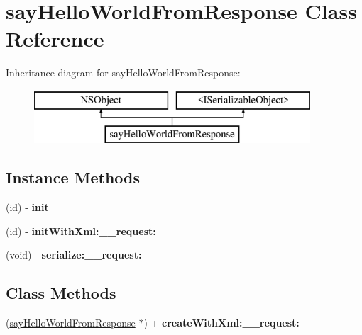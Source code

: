 \hypertarget{interfacesay_hello_world_from_response}{}\section{say\+Hello\+World\+From\+Response Class Reference}
\label{interfacesay_hello_world_from_response}
Inheritance diagram for say\+Hello\+World\+From\+Response\+:\begin{figure}[H]
\begin{center}
\leavevmode
\includegraphics[height=2.000000cm]{interfacesay_hello_world_from_response}
\end{center}
\end{figure}
\subsection*{Instance Methods}
\begin{DoxyCompactItemize}
\item 
\hypertarget{interfacesay_hello_world_from_response_aa3250bb384dc234066e4f31fa0947bf1}{}(id) -\/ {\bfseries init}\label{interfacesay_hello_world_from_response_aa3250bb384dc234066e4f31fa0947bf1}

\item 
\hypertarget{interfacesay_hello_world_from_response_a0945b9d35fece5dc2111ef72299a0932}{}(id) -\/ {\bfseries init\+With\+Xml\+:\+\_\+\+\_\+request\+:}\label{interfacesay_hello_world_from_response_a0945b9d35fece5dc2111ef72299a0932}

\item 
\hypertarget{interfacesay_hello_world_from_response_a2844d4827ae3c00f59ff199e260b092c}{}(void) -\/ {\bfseries serialize\+:\+\_\+\+\_\+request\+:}\label{interfacesay_hello_world_from_response_a2844d4827ae3c00f59ff199e260b092c}

\end{DoxyCompactItemize}
\subsection*{Class Methods}
\begin{DoxyCompactItemize}
\item 
\hypertarget{interfacesay_hello_world_from_response_ac7f4766ebaa54e5fdb1a2b42be88f297}{}(\hyperlink{interfacesay_hello_world_from_response}{say\+Hello\+World\+From\+Response} $\ast$) + {\bfseries create\+With\+Xml\+:\+\_\+\+\_\+request\+:}\label{interfacesay_hello_world_from_response_ac7f4766ebaa54e5fdb1a2b42be88f297}

\end{DoxyCompactItemize}
